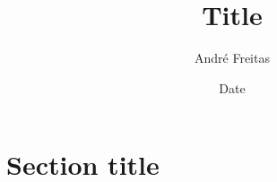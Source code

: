 \documentclass[hidelinks]{article}
\title{Title}
\author{André Freitas}
\date{Date}
\begin{document}
\maketitle

\section{Section title}
\end{document}
